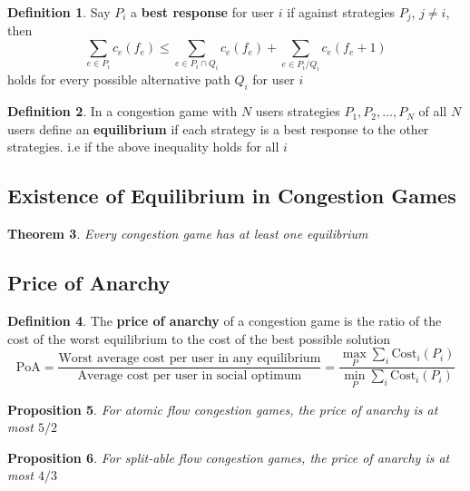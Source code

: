 \documentclass[11pt]{article}
\theoremstyle{plain}
\newtheorem{theorem}{Theorem}[section]
\newtheorem{proposition}[theorem]{Proposition}
\theoremstyle{definition}
\newtheorem{definition}[theorem]{Definition}
\theoremstyle{remark}
\begin{document}
\begin{definition}
    Say \(P_{i}\) a \textbf{best response} for user \(i\) if against strategies \(P_{j}\), \(j \neq i\), then
    \[
        \sum_{e \in P_{i}} c_{e}(f_{e}) \leq \sum_{e \in P_{i} \cap Q_{i}} c_{e}(f_{e}) + \sum_{e \in P_{i} / Q_{i}} c_{e}(f_{e} + 1)   
    \]
    holds for every possible alternative path \(Q_{i}\) for user \(i\)
\end{definition}

\begin{definition}
    In a congestion game with \(N\) users strategies \(P_1, P_2, \ldots , P_{N} \)  of all \(N\) users define an \textbf{equilibrium} if each strategy is a best response to the other strategies. i.e if the above inequality holds for all \(i\)
\end{definition}

\subsection{Existence of Equilibrium in Congestion Games}

\begin{theorem}
    Every congestion game has at least one equilibrium
\end{theorem}

\subsection{Price of Anarchy}

\begin{definition}
    The \textbf{price of anarchy} of a congestion game is the ratio of the cost of the worst equilibrium to the cost of the best possible solution
    \[
        \text{PoA} = \frac{\text{Worst average cost per user in any equilibrium}}{\text{Average cost per user in social optimum} } = \frac{\max_{P} \sum_{i} \text{Cost}_{i}(P_{i})}{\min_{P} \sum_{i} \text{Cost}_{i}(P_{i})}  
    \]
\end{definition}

\begin{proposition}
    For atomic flow congestion games, the price of anarchy is at most \(5/2\)
\end{proposition}

\begin{proposition}
    For split-able flow congestion games, the price of anarchy is at most \(4/3\)
\end{proposition}
\end{document}
